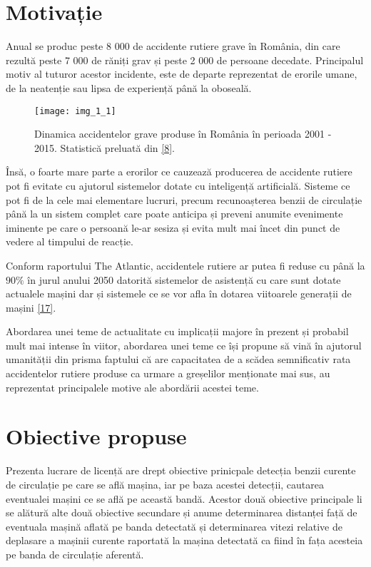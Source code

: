 \section{Motivație}

Anual se produc peste 8 000 de accidente rutiere grave în România, din care rezultă peste 7 000 de răniți grav și peste 2 000 de persoane decedate. Principalul motiv al tuturor acestor incidente, este de departe reprezentat de erorile umane, de la neatenție sau lipsa de experiență până la oboseală.
\begin{figure}[!h]
	\centering
	\texttt{[image: img\_1\_1]}
	\caption[Dinamica accidente rutiere]{Dinamica accidentelor grave produse în România în perioada 2001 - 2015. Statistică preluată din \hyperlink{Dinamicaaccidentelorrutiere}{[8]}.}
\end{figure} 

Însă, o foarte mare parte a erorilor ce cauzează producerea de accidente rutiere pot fi evitate cu ajutorul sistemelor dotate cu inteligență artificială. Sisteme ce pot fi de la cele mai elementare lucruri, precum recunoașterea benzii de circulație până la un sistem complet care poate anticipa și preveni anumite evenimente iminente pe care o persoană le-ar sesiza și evita mult mai încet din punct de vedere al timpului de reacție.

Conform raportului The Atlantic, accidentele rutiere ar putea fi reduse cu până la $90\%$ în jurul anului 2050 datorită sistemelor de asistență cu care sunt dotate actualele mașini dar și sistemele ce se vor afla în dotarea viitoarele generații de mașini \hyperlink{TheAtlantic}{[17]}.

Abordarea unei teme de actualitate cu implicații majore în prezent și probabil mult mai intense în viitor, abordarea unei teme ce își propune să vină în ajutorul umanității din prisma faptului că are capacitatea de a scădea semnificativ rata accidentelor rutiere produse ca urmare a greșelilor menționate mai sus, au reprezentat principalele motive ale abordării acestei teme.

\section{Obiective propuse}

Prezenta lucrare de licență are drept obiective prinicpale detecția benzii curente de circulație pe care se află mașina, iar pe baza acestei detecții, cautarea eventualei mașini ce se află pe această bandă. 
Acestor două obiective principale li se alătură alte două obiective secundare și anume determinarea distanței față de eventuala mașină aflată pe banda detectată și determinarea vitezi relative de deplasare a mașinii curente raportată la mașina detectată ca fiind în fața acesteia pe banda de circulație aferentă.

